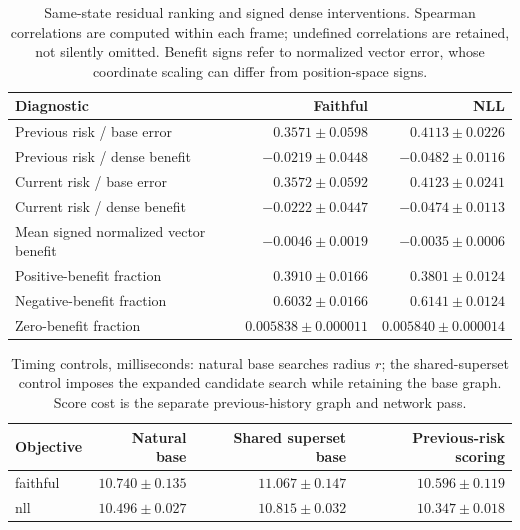 \begin{table}[t]
\centering\small
\caption{Same-state residual ranking and signed dense interventions. Spearman correlations are computed within each frame; undefined correlations are retained, not silently omitted. Benefit signs refer to normalized vector error, whose coordinate scaling can differ from position-space signs.}
\label{tab:full-benefit}
\begin{tabular}{lrr}
\toprule
Diagnostic & Faithful & NLL\\
\midrule
Previous risk / base error & $0.3571\pm0.0598$ & $0.4113\pm0.0226$\\
Previous risk / dense benefit & $-0.0219\pm0.0448$ & $-0.0482\pm0.0116$\\
Current risk / base error & $0.3572\pm0.0592$ & $0.4123\pm0.0241$\\
Current risk / dense benefit & $-0.0222\pm0.0447$ & $-0.0474\pm0.0113$\\
Mean signed normalized vector benefit & $-0.0046\pm0.0019$ & $-0.0035\pm0.0006$\\
Positive-benefit fraction & $0.3910\pm0.0166$ & $0.3801\pm0.0124$\\
Negative-benefit fraction & $0.6032\pm0.0166$ & $0.6141\pm0.0124$\\
Zero-benefit fraction & $0.005838\pm0.000011$ & $0.005840\pm0.000014$\\
\bottomrule
\end{tabular}
\end{table}


\begin{table}[t]
\centering\small
\caption{Timing controls, milliseconds: natural base searches radius $r$; the shared-superset control imposes the expanded candidate search while retaining the base graph. Score cost is the separate previous-history graph and network pass.}
\label{tab:full-cost-controls}
\begin{tabular}{lrrr}
\toprule
Objective & Natural base & Shared superset base & Previous-risk scoring\\
\midrule
faithful & $10.740\pm0.135$ & $11.067\pm0.147$ & $10.596\pm0.119$\\
nll & $10.496\pm0.027$ & $10.815\pm0.032$ & $10.347\pm0.018$\\
\bottomrule
\end{tabular}
\end{table}


